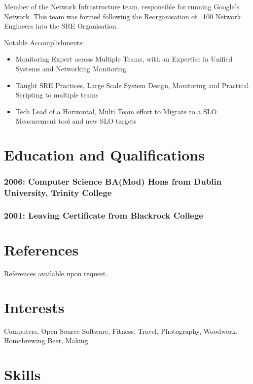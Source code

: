 \documentclass[a4paper, 10pt] {article}
\begin{document}
Member of the Network Infrastructure team, responsible for running Google's Network. This team was formed
following the Reorganisation of ~100 Network Engineers into the SRE Organisation.

\vspace{5mm} %

Notable Accomplishments:

\begin{itemize}
  \item Monitoring Expert across Multiple Teams, with an Expertise in Unified Systems and Networking Monitoring
  \item Taught SRE Practices, Large Scale System Design, Monitoring and Practical Scripting to multiple teams
  \item Tech Lead of a Horizontal, Multi Team effort to Migrate to a SLO Measurement tool and new SLO targets
\end{itemize}

\section*{Education and Qualifications}

\subsubsection*{2006: Computer Science BA(Mod) Hons from Dublin University, Trinity College}

\subsubsection*{2001: Leaving Certificate from Blackrock College}

\section*{References}

References available upon request.

\section*{Interests}

Computers, Open Source Software, Fitness, Travel, Photography, Woodwork, Homebrewing Beer, Making

\section*{Skills}
\end{document}
